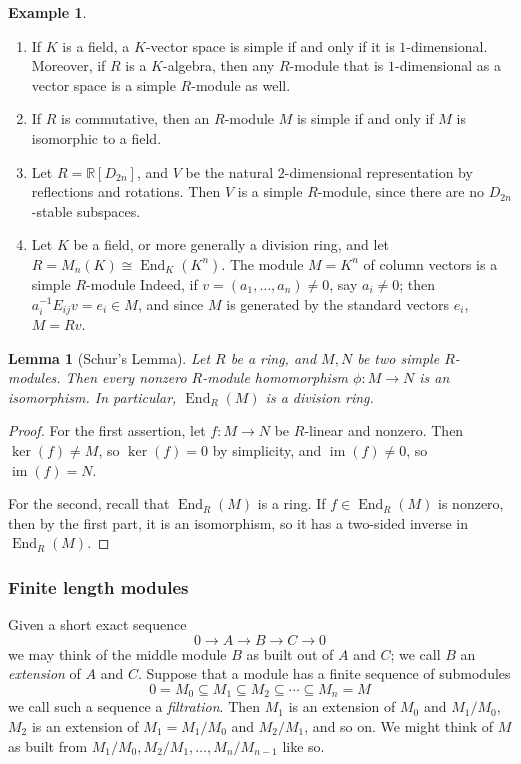 \documentclass{amsart}[12pt]
\def\End{\operatorname{End}}
\def\image{\operatorname{im}}
\def\im{\image}
\def\ker{\operatorname{ker}}
\newcommand{\R}{{\mathbb{R}}}
\newcommand{\DEF}[1]{\emph{#1}\index{#1}}
\numberwithin{equation}{section}
\theoremstyle{plain} %
\newtheorem{lem}[equation]{Lemma}
\theoremstyle{definition}
\newtheorem{ex}[equation]{Example}
\theoremstyle{remark}
\newcommand{\sssec}[1]{\subsubsection{#1}}
\begin{document}
\begin{ex}
\begin{enumerate}
\item If $K$ is a field, a $K$-vector space is simple if and only if it is $1$-dimensional. Moreover, if $R$ is a $K$-algebra, then any $R$-module that is $1$-dimensional as a vector space is a simple $R$-module as well.

\item If $R$ is commutative, then an $R$-module $M$ is simple if and only if $M$ is isomorphic to a field.

\item Let $R=\R[D_{2n}]$, and $V$ be the natural $2$-dimensional representation by reflections and rotations. Then $V$ is a simple $R$-module, since there are no $D_{2n}$-stable subspaces.

\item Let $K$ be a field, or more generally a division ring, and let $R=M_n(K) \cong \End_K(K^n)$. The module $M=K^n$ of column vectors is a simple $R$-module
Indeed, if $v=(a_1,\dots,a_n)\neq 0$, say $a_i\neq 0$; then $a_i^{-1} E_{ij} v = e_i \in M$, and since $M$ is generated by the standard vectors $e_i$, $M = Rv$.
\end{enumerate}
\end{ex}



\begin{lem}[Schur's Lemma] Let $R$ be a ring, and $M,N$ be two simple $R$-modules. Then every nonzero $R$-module homomorphism $\phi:M\to N$ is an isomorphism. In particular, $\End_R(M)$ is a division ring.
\end{lem}
\begin{proof} For the first assertion, let $f:M\to N$ be $R$-linear and nonzero. Then $\ker(f)\neq M$, so $\ker(f)=0$ by simplicity, and $\im(f) \neq 0$, so $\im(f) = N$.

For the second, recall that $\End_R(M)$ is a ring. If $f\in \End_R(M)$ is nonzero, then by the first part, it is an isomorphism, so it has a two-sided inverse in $\End_R(M)$.
\end{proof}


\sssec{Finite length modules}

Given a short exact sequence 
\[ 0 \to A \to B \to C \to 0\]
we may think of the middle module $B$ as built out of $A$ and $C$; we call $B$ an \DEF{extension} of $A$ and $C$. 
Suppose that a module has a  finite sequence of submodules
\[ 0 = M_0 \subseteq M_1 \subseteq M_2 \subseteq \cdots \subseteq M_n = M\]
we call such a sequence a \DEF{filtration}. Then $M_1$ is an extension of $M_0$ and $M_1/M_0$, $M_2$ is an extension of $M_1=M_1/M_0$ and $M_2/M_1$, and so on. We might think of $M$ as built from $M_1/M_0, M_2/M_1,\dots,M_n/M_{n-1}$ like so.
\end{document}
